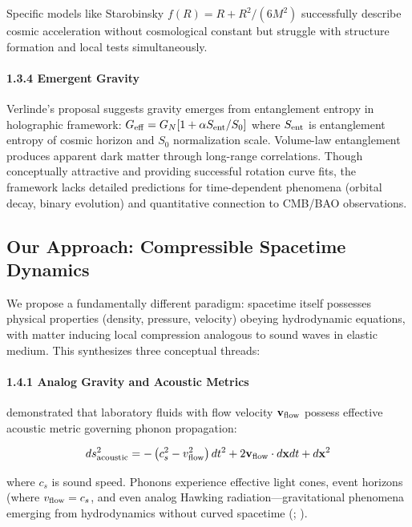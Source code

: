 \documentclass[11pt,a4paper]{article}
\begin{document}
Specific models like Starobinsky \(f(R) = R + R^2/(6M^2)\) successfully
describe cosmic acceleration without cosmological constant but struggle
with structure formation and local tests simultaneously.

\hypertarget{emergent-gravity}{%
\paragraph{1.3.4 Emergent Gravity}\label{emergent-gravity}}

Verlinde's proposal \cite{Verlinde2011,Verlinde2017} suggests gravity emerges from
entanglement entropy in holographic framework:
\(G_{\rm eff} = G_N[1 + \alpha S_{\rm ent}/S_0]\) where \(S_{\rm ent}\)
is entanglement entropy of cosmic horizon and \(S_0\) normalization
scale. Volume-law entanglement produces apparent dark matter through
long-range correlations. Though conceptually attractive and providing
successful rotation curve fits, the framework lacks detailed predictions
for time-dependent phenomena (orbital decay, binary evolution) and
quantitative connection to CMB/BAO observations.

\hypertarget{our-approach-compressible-spacetime-dynamics}{%
\subsection{Our Approach: Compressible Spacetime
Dynamics}\label{our-approach-compressible-spacetime-dynamics}}

We propose a fundamentally different paradigm: spacetime itself
possesses physical properties (density, pressure, velocity) obeying
hydrodynamic equations, with matter inducing local compression analogous
to sound waves in elastic medium. This synthesizes three conceptual
threads:

\hypertarget{analog-gravity-and-acoustic-metrics}{%
\paragraph{1.4.1 Analog Gravity and Acoustic
Metrics}\label{analog-gravity-and-acoustic-metrics}}

\cite{Unruh1981} demonstrated that laboratory fluids with flow velocity
\({\bf v}_{\rm flow}\) possess effective acoustic metric governing
phonon propagation:

\[ds^2_{\rm acoustic} = -\left(c_s^2 - v_{\rm flow}^2\right)dt^2 + 2{\bf v}_{\rm flow} \cdot d{\bf x} dt + d{\bf x}^2\]

where \(c_s\) is sound speed. Phonons experience effective light cones,
event horizons (where \(v_{\rm flow} = c_s\), and even analog Hawking
radiation---gravitational phenomena emerging from hydrodynamics without
curved spacetime (\cite{Barcelo2011}; \cite{Steinhauer2016}).
\end{document}
